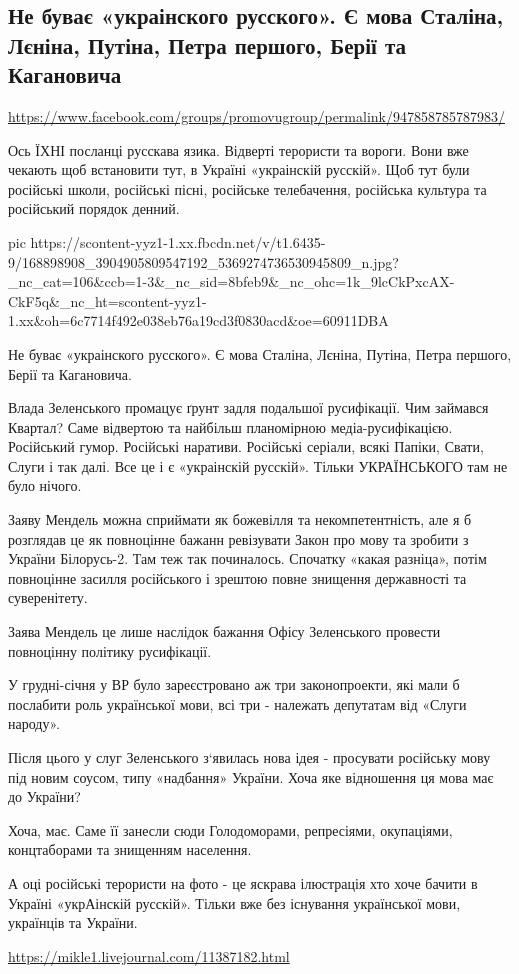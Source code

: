  
 
 
 
 

\subsection{Не буває «украінского русского». Є мова Сталіна, Лєніна, Путіна, Петра першого, Берії та Кагановича}
\url{https://www.facebook.com/groups/promovugroup/permalink/947858785787983/}

Ось ЇХНІ посланці русскава язика. Відверті терористи та вороги. Вони вже
чекають щоб встановити тут, в Україні  «украінскій русскій». Щоб тут були
російські школи, російські пісні, російське телебачення, російська культура та
російський порядок денний. 

\ifcmt
  pic https://scontent-yyz1-1.xx.fbcdn.net/v/t1.6435-9/168898908_3904905809547192_5369274736530945809_n.jpg?_nc_cat=106&ccb=1-3&_nc_sid=8bfeb9&_nc_ohc=1k_9lcCkPxcAX-CkF5q&_nc_ht=scontent-yyz1-1.xx&oh=6c7714f492e038eb76a19cd3f0830acd&oe=60911DBA
\fi

Не буває «украінского русского». Є мова Сталіна, Лєніна, Путіна, Петра першого, Берії та Кагановича. 

Влада Зеленського промацує ґрунт задля подальшої русифікації. Чим займався
Квартал? Саме відвертою та найбільш планомірною медіа-русифікацією. Російський
гумор. Російські наративи. Російські серіали, всякі Папіки, Свати, Слуги і так
далі. Все це і є «украінскій русскій». Тільки УКРАЇНСЬКОГО там не було нічого.

Заяву Мендель можна сприймати як божевілля та некомпетентність, але я б
розглядав це як повноцінне бажанн ревізувати Закон про мову та зробити з
України Білорусь-2. Там теж так починалось. Спочатку «какая разніца», потім
повноцінне засилля російського і зрештою повне знищення державності та
суверенітету. 

Заява Мендель це лише наслідок бажання Офісу Зеленського провести повноцінну політику русифікації.

У грудні-січня у ВР було зареєстровано аж три законопроекти, які мали б
послабити роль української мови, всі три - належать депутатам від «Слуги
народу». 

Після цього у слуг Зеленського з‘явилась нова ідея - просувати російську мову
під новим соусом, типу «надбання» України.  Хоча яке відношення ця мова має до
України? 

Хоча, має. Саме її занесли сюди Голодоморами, репресіями, окупаціями,
концтаборами та знищенням населення. 

А оці російські терористи на фото - це яскрава ілюстрація хто хоче бачити в
Україні «укрАінскій русскій». Тільки вже без існування української мови,
українців та України.

\url{https://mikle1.livejournal.com/11387182.html}
